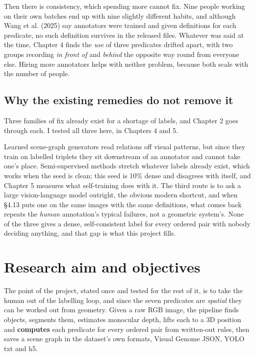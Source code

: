 Then there is consistency, which spending more cannot fix. Nine people working on their own batches end up with nine slightly different habits, and although Wang et al. (2025) say annotators were trained and given definitions for each predicate, no such definition survives in the released files. Whatever was said at the time, Chapter 4 finds the \textit{use} of three predicates drifted apart, with two groups recording \textit{in front of} and \textit{behind} the opposite way round from everyone else. Hiring more annotators helps with neither problem, because both scale with the number of people.

\subsection{Why the existing remedies do not remove it}

Three families of fix already exist for a shortage of labels, and Chapter 2 goes through each. I tested all three here, in Chapters 4 and 5.

Learned scene-graph generators read relations off visual patterns, but since they train on labelled triplets they sit downstream of an annotator and cannot take one's place. Semi-supervised methods stretch whatever labels already exist, which works when the seed is clean; this seed is 10\% dense and disagrees with itself, and Chapter 5 measures what self-training does with it. The third route is to ask a large vision-language model outright, the obvious modern shortcut, and when \S{}4.13 puts one on the same images with the same definitions, what comes back repeats the \textit{human} annotation's typical failures, not a geometric system's. None of the three gives a dense, self-consistent label for every ordered pair with nobody deciding anything, and that gap is what this project fills.

\section{Research aim and objectives}

The point of the project, stated once and tested for the rest of it, is to take the human out of the labelling loop, and since the seven predicates are \textit{spatial} they can be worked out from geometry. Given a raw RGB image, the pipeline finds objects, segments them, estimates monocular depth, lifts each to a 3D position and \textbf{computes} each predicate for every ordered pair from written-out rules, then saves a scene graph in the dataset's own formats, Visual Genome JSON, YOLO txt and h5.

